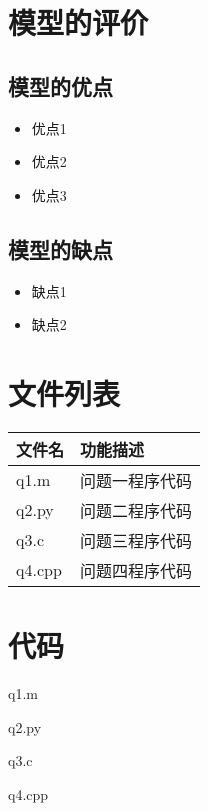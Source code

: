 \documentclass[withoutpreface,bwprint]{cumcmthesis}
\begin{document}

\section{模型的评价}

\subsection{模型的优点}
\begin{itemize}[itemindent=2em]
\item 优点1
\item 优点2
\item 优点3
\end{itemize}

\subsection{模型的缺点}
\begin{itemize}[itemindent=2em]
\item 缺点1
\item 缺点2
\end{itemize}

\nocite{*}

\newpage
\begin{appendices}
\section{文件列表}
\begin{table}[H]
\centering
\begin{tabularx}{\textwidth}{LL}
\toprule
文件名   & 功能描述 \\
\midrule
q1.m & 问题一程序代码 \\
q2.py & 问题二程序代码 \\
q3.c & 问题三程序代码 \\
q4.cpp & 问题四程序代码 \\
\bottomrule
\end{tabularx}
\label{tab:文件列表}
\end{table}

\section{代码}
\noindent q1.m

q2.py

q3.c

q4.cpp

\end{appendices}
\end{document}

